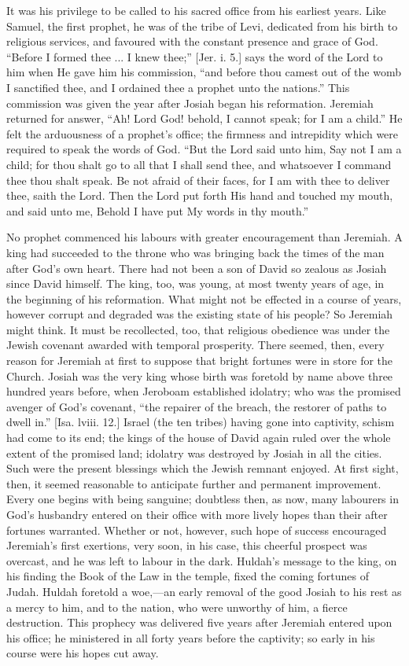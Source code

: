 It was his privilege to be called to his sacred office from his
earliest years. Like Samuel, the first prophet, he was of the tribe of
Levi, dedicated from his birth to religious services, and favoured
with the constant presence and grace of God. ``Before I formed
thee ... I knew thee;'' [Jer. i. 5.] says the word of the Lord to
him when He gave him his commission, ``and before thou camest out
of the womb I sanctified thee, and I ordained thee a prophet unto the
nations.'' This commission was given the year after Josiah began
his reformation. Jeremiah returned for answer, ``Ah! Lord God!
behold, I cannot speak; for I am a child.'' He felt the
arduousness of a prophet's office; the firmness and intrepidity which
were required to speak the words of God. ``But the Lord said unto
him, Say not I am a child; for thou shalt go to all that I shall send
thee, and whatsoever I command thee thou shalt speak. Be not afraid of
their faces, for I am with thee to deliver thee, saith the Lord. Then
the Lord put forth His hand and touched my mouth, and said unto me,
Behold I have put My words in thy mouth.''

No prophet commenced his labours with greater encouragement than
Jeremiah. A king had succeeded to the throne who was bringing back the
times of the man after God's own heart. There had not been a son of
David so zealous as Josiah since David himself. The king, too, was
young, at most twenty years of age, in the beginning of his
reformation. What might not be effected in a course of years, however
corrupt and degraded was the existing state of his people? So Jeremiah
might think. It must be recollected, too, that religious obedience was
under the Jewish covenant awarded with temporal prosperity. There
seemed, then, every reason for Jeremiah at first to suppose that
bright fortunes were in store for the Church. Josiah was the very king
whose birth was foretold by name above three hundred years before,
when Jeroboam established idolatry; who was the promised avenger of
God's covenant, ``the repairer of the breach, the restorer of
paths to dwell in.'' [Isa. lviii. 12.] Israel (the ten tribes)
having gone into captivity, schism had come to its end; the kings of
the house of David again ruled over the whole extent of the promised
land; idolatry was destroyed by Josiah in all the cities. Such were
the present blessings which the Jewish remnant enjoyed. At first
sight, then, it seemed reasonable to anticipate further and permanent
improvement. Every one begins with being sanguine; doubtless then, as
now, many labourers in God's husbandry entered on their office with
more lively hopes than their after fortunes warranted. Whether or not,
however, such hope of success encouraged Jeremiah's first exertions,
very soon, in his case, this cheerful prospect was overcast, and he
was left to labour in the dark. Huldah's message to the king, on his
finding the Book of the Law in the temple, fixed the coming fortunes
of Judah. Huldah foretold a woe,—an early removal of the good Josiah
to his rest as a mercy to him, and to the nation, who were unworthy of
him, a fierce destruction. This prophecy was delivered five years
after Jeremiah entered upon his office; he ministered in all forty
years before the captivity; so early in his course were his hopes cut
away.

